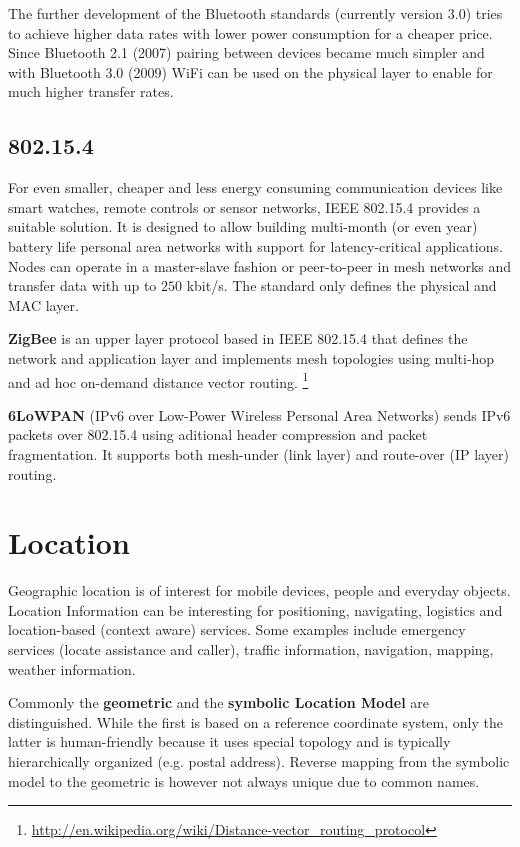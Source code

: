 \documentclass{article}
\begin{document}
\begin{multicols}{2}
The further development of the Bluetooth standards (currently version 3.0) tries
to achieve higher data rates with lower power consumption for a cheaper price.
Since Bluetooth 2.1 (2007) pairing between devices became much simpler and with
Bluetooth 3.0 (2009) WiFi can be used on the physical layer to enable for much
higher transfer rates.

\subsection{802.15.4}
For even smaller, cheaper and less energy consuming communication devices like
smart watches, remote controls or sensor networks, IEEE 802.15.4 provides a
suitable solution. It is designed to allow building multi-month (or even year)
battery life personal area networks with support for latency-critical
applications. Nodes can operate in a master-slave fashion or peer-to-peer in
mesh networks and transfer data with up to $250$ kbit/s. The standard only
defines the physical and MAC layer.


{\bf ZigBee} is an upper layer protocol based in IEEE 802.15.4 that defines the
network and application layer and implements mesh topologies using multi-hop and
ad hoc on-demand distance vector
routing.%
\footnote{\href{http://en.wikipedia.org/wiki/Distance-vector_routing_protocol}
{http://en.wikipedia.org/wiki/Distance-vector\_routing\_protocol}}


{\bf 6LoWPAN} (IPv6 over Low-Power Wireless Personal Area Networks) sends IPv6
packets over 802.15.4 using aditional header compression and packet
fragmentation. It supports both mesh-under (link layer) and route-over (IP
layer) routing.



\section{Location}
Geographic location is of interest for mobile devices, people and everyday
objects. Location Information can be interesting for positioning, navigating,
logistics and location-based (context aware) services. Some examples include
emergency services (locate assistance and caller), traffic information,
navigation, mapping, weather information.

Commonly the {\bf geometric} and the {\bf symbolic Location Model} are
distinguished. While the first is based on a reference coordinate system, only
the latter is human-friendly because it uses special topology and is typically
hierarchically organized (e.g. postal address). Reverse mapping from the
symbolic model to the geometric is however not always unique due to common
names.


\end{multicols}
\end{document}
